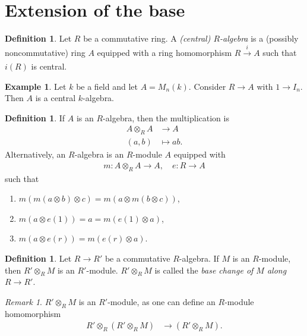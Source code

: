 \documentclass[12pt]{report}
\theoremstyle{plain}
\theoremstyle{remark}
\newtheorem*{remark}{Remark}
\theoremstyle{definition}
\newtheorem{definition}[theorem]{Definition}
\newtheorem{example}[theorem]{Example}
\begin{document}
\section{Extension of the base}

\begin{definition}
    Let $R$ be a commutative ring. A \emph{(central) $R$-algebra} is a (possibly noncommutative) ring $A$ equipped with a ring homomorphism $R\xrightarrow[]{i}A$ such that $i(R)$ is central.
\end{definition}

\begin{example}
    Let $k$ be a field and let $A=M_n(k)$. Consider $R\to A$ with $1\to I_n$. Then $A$ is a central $k$-algebra.
\end{example}

\begin{definition}
    If $A$ is an $R$-algebra, then the multiplication is
    \begin{align*}
        A\otimes_R A &\to A \\
        (a,b) &\mapsto ab.
    \end{align*}
    Alternatively, an $R$-algebra is an $R$-module $A$ equipped with
    \begin{align*}
        m:A\otimes_R A\to A,\quad e:R\to A
    \end{align*}
    such that
    \begin{enumerate}
        \item $m(m(a\otimes b)\otimes c) = m(a\otimes m(b\otimes c))$,
        \item $m(a\otimes e(1)) = a = m(e(1)\otimes a)$,
        \item $m(a\otimes e(r)) = m(e(r)\otimes a)$.
    \end{enumerate}
\end{definition}

\begin{definition}
    Let $R\to R'$ be a commutative $R$-algebra. If $M$ is an $R$-module, then $R'\otimes_R M$ is an $R'$-module. $R'\otimes_R M$ is called the \emph{base change of $M$ along $R\to R'$}.
\end{definition}
\begin{remark}
    $R'\otimes_R M$ is an $R'$-module, as one can define an $R$-module homomorphism
    \begin{align*}
        R'\otimes_R (R'\otimes_R M) &\to (R'\otimes_R M).
    \end{align*}
\end{remark}
\end{document}
